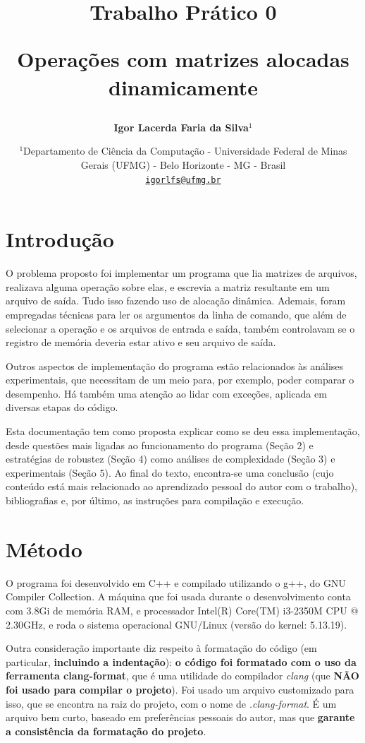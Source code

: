 \documentclass{article}
\author{\textbf{Igor Lacerda Faria da Silva\( ^1 \)} }
\title{\textbf{Trabalho Prático 0}

\textbf{Operações com matrizes alocadas dinamicamente}}
\date{%
    \( ^1 \)Departamento de Ciência da Computação - Universidade Federal de Minas Gerais (UFMG) - Belo Horizonte - MG - Brasil \\ [2ex]
    \href{mailto:igorlfs@ufmg.br}{\nolinkurl{igorlfs@ufmg.br}}
}
\begin{document}
\maketitle
\section{Introdução}
O problema proposto foi implementar um programa que lia matrizes de arquivos, realizava alguma operação sobre elas, e escrevia a matriz resultante em um arquivo de saída. Tudo isso fazendo uso de alocação dinâmica. Ademais, foram empregadas técnicas para ler os argumentos da linha de comando, que além de selecionar a operação e os arquivos de entrada e saída, também controlavam se o registro de memória deveria estar ativo e seu arquivo de saída.

\sloppy Outros aspectos de implementação do programa estão relacionados às análises experimentais, que necessitam de um meio para, por exemplo, poder comparar o desempenho. Há também uma atenção ao lidar com exceções, aplicada em diversas etapas do código.

Esta documentação tem como proposta explicar como se deu essa implementação, desde questões mais ligadas ao funcionamento do programa (Seção 2) e estratégias de robustez (Seção 4) como análises de complexidade (Seção 3) e experimentais (Seção 5). Ao final do texto, encontra-se uma conclusão (cujo conteúdo está mais relacionado ao aprendizado pessoal do autor com o trabalho), bibliografias e, por último, as instruções para compilação e execução.

\section{Método}
O programa foi desenvolvido em C++ e compilado utilizando o g++, do GNU Compiler Collection. A máquina que foi usada durante o desenvolvimento conta com 3.8Gi de memória RAM, e processador Intel(R) Core(TM) i3-2350M CPU @ 2.30GHz, e roda o sistema operacional GNU/Linux (versão do kernel: 5.13.19).

Outra consideração importante diz respeito à formatação do código (em particular, \textbf{incluindo a indentação}): \textbf{o código foi formatado com o uso da ferramenta clang-format}, que é uma utilidade do compilador \textit{clang} (que \textbf{NÃO foi usado para compilar o projeto}). Foi usado um arquivo customizado para isso, que se encontra na raiz do projeto, com o nome de \textit{.clang-format}. É um arquivo bem curto, baseado em preferências pessoais do autor, mas que \textbf{garante a consistência da formatação do projeto}.
\end{document}
